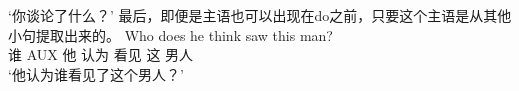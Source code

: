 \glt `你谈论了什么？'
\zl
最后，即便是主语也可以出现在do之前，只要这个主语是从其他小句提取出来的。
\ea
\settowidth{}
\gll Who does he think saw this man?\\   
     谁 AUX 他 认为 看见 这 男人\\
\glt `他认为谁看见了这个男人？'
\z
%
%

